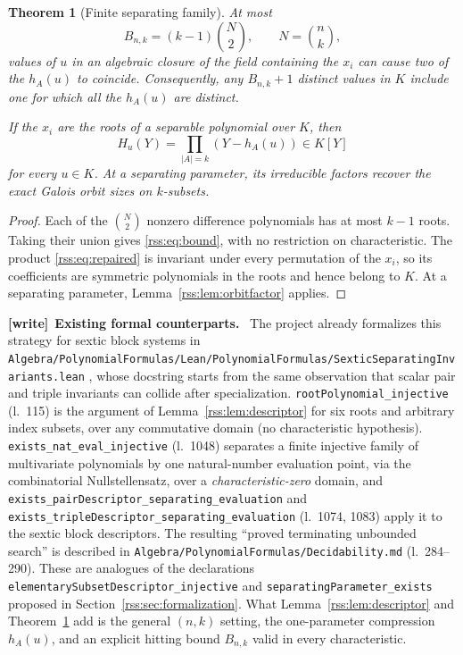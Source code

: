 \documentclass[11pt,a4paper]{article}
\newtheorem{theorem}{Theorem}[section]
\theoremstyle{definition}
\theoremstyle{remark}
\newcommand{\code}[1]{{\small\nolinkurl{#1}}}
\newenvironment{writenote}[1][]{\par\smallskip\begingroup\small
 \noindent\textbf{[write]}\if\relax\detokenize{#1}\relax\else~\textbf{#1.}\fi\ }%
 {\par\endgroup\smallskip}
\newcommand{\repo}[1]{\code{#1}}
\begin{document}
\begin{theorem}[Finite separating family]\label{rss:thm:repair}
At most
\begin{equation}
 B_{n,k}=(k-1)\binom{N}{2},\qquad N=\binom nk,
 \label{rss:eq:bound}
\end{equation}
values of $u$ in an algebraic closure of the field containing the $x_i$
can cause two of the $h_A(u)$ to
coincide. Consequently, any $B_{n,k}+1$ distinct values in $K$ include one
for which all the $h_A(u)$ are distinct.

If the $x_i$ are the roots of a separable polynomial over $K$, then
\begin{equation}
 H_u(Y)=\prod_{|A|=k}(Y-h_A(u))\in K[Y]
 \label{rss:eq:repaired}
\end{equation}
for every $u\in K$. At a separating parameter, its irreducible factors
recover the exact Galois orbit sizes on $k$-subsets.
\end{theorem}
\begin{proof}
Each of the $\binom N2$ nonzero difference polynomials has at most $k-1$
roots. Taking their union gives \eqref{rss:eq:bound}, with no restriction on
characteristic. The product \eqref{rss:eq:repaired} is invariant under every
permutation of the $x_i$, so its coefficients are symmetric polynomials in
the roots and hence belong to $K$. At a separating parameter,
Lemma~\ref{rss:lem:orbitfactor} applies.
\end{proof}

\begin{writenote}[Existing formal counterparts]
The project already formalizes this strategy for sextic block systems in
\repo{Algebra/PolynomialFormulas/Lean/PolynomialFormulas/SexticSeparatingInvariants.lean}
\cite{repoSextic}, whose docstring starts from the same observation that
scalar pair and triple invariants can collide after specialization.
\code{rootPolynomial_injective} (l.~115) is the argument of
Lemma~\ref{rss:lem:descriptor} for six roots and arbitrary index subsets,
over any commutative domain (no characteristic hypothesis).
\code{exists_nat_eval_injective} (l.~1048) separates a finite injective
family of multivariate polynomials by one natural-number evaluation point,
via the combinatorial Nullstellensatz, over a \emph{characteristic-zero}
domain, and \code{exists_pairDescriptor_separating_evaluation} and
\code{exists_tripleDescriptor_separating_evaluation} (l.~1074, 1083) apply it
to the sextic block descriptors. The resulting ``proved terminating unbounded
search'' is described in \repo{Algebra/PolynomialFormulas/Decidability.md}
(l.~284--290). These are analogues of the declarations
\code{elementarySubsetDescriptor_injective} and
\code{separatingParameter_exists} proposed in
Section~\ref{rss:sec:formalization}. What
Lemma~\ref{rss:lem:descriptor} and Theorem~\ref{rss:thm:repair} add is the
general $(n,k)$ setting, the one-parameter compression $h_A(u)$, and an
explicit hitting bound $B_{n,k}$ valid in every characteristic.
\end{writenote}
\end{document}
